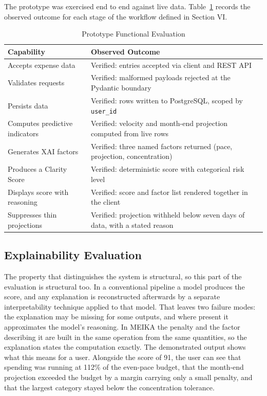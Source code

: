 \documentclass[conference]{IEEEtran}
\begin{document}
The prototype was exercised end to end against live data. Table~\ref{tab:functional} records the observed outcome for each stage of the workflow defined in Section VI.

\begin{table}[!t]
\centering
\caption{Prototype Functional Evaluation}
\label{tab:functional}
\footnotesize
\renewcommand{\arraystretch}{1.3}
\begin{tabular}{|p{3.5cm}|p{4.2cm}|}
\hline
\textbf{Capability} & \textbf{Observed Outcome} \\
\hline
Accepts expense data & Verified: entries accepted via client and REST API \\
\hline
Validates requests & Verified: malformed payloads rejected at the Pydantic boundary \\
\hline
Persists data & Verified: rows written to PostgreSQL, scoped by \texttt{user\_id} \\
\hline
Computes predictive indicators & Verified: velocity and month-end projection computed from live rows \\
\hline
Generates XAI factors & Verified: three named factors returned (pace, projection, concentration) \\
\hline
Produces a Clarity Score & Verified: deterministic score with categorical risk level \\
\hline
Displays score with reasoning & Verified: score and factor list rendered together in the client \\
\hline
Suppresses thin projections & Verified: projection withheld below seven days of data, with a stated reason \\
\hline
\end{tabular}
\end{table}

\subsection{Explainability Evaluation}

The property that distinguishes the system is structural, so this part of the evaluation is structural too. In a conventional pipeline a model produces the score, and any explanation is reconstructed afterwards by a separate interpretability technique applied to that model. That leaves two failure modes: the explanation may be missing for some outputs, and where present it approximates the model's reasoning. In MEIKA the penalty and the factor describing it are built in the same operation from the same quantities, so the explanation states the computation exactly. The demonstrated output shows what this means for a user. Alongside the score of 91, the user can see that spending was running at 112\% of the even-pace budget, that the month-end projection exceeded the budget by a margin carrying only a small penalty, and that the largest category stayed below the concentration tolerance.
\end{document}
